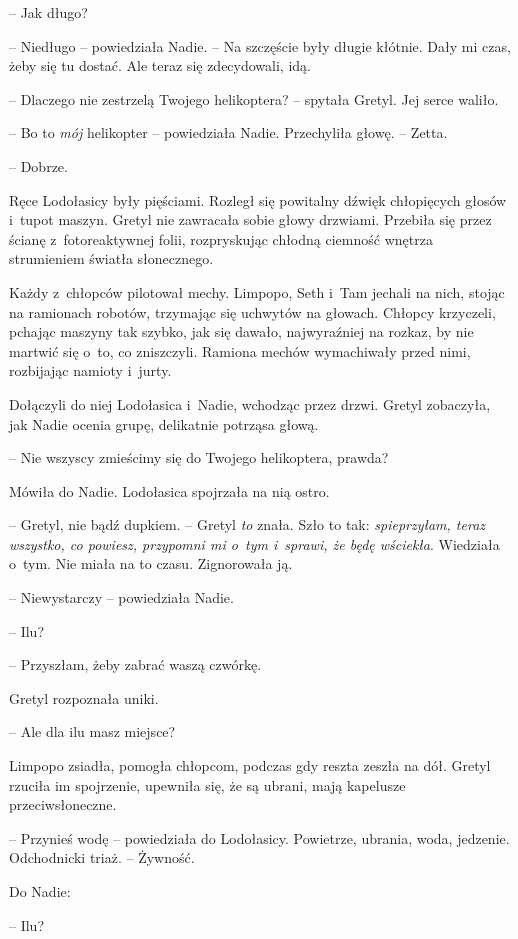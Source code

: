 \documentclass[oneside,polish,11pt,sfheadings]{mwbk}
\begin{document}
-- Jak długo?

-- Niedługo -- powiedziała Nadie. -- Na szczęście były długie kłótnie. Dały
mi czas, żeby się tu dostać. Ale teraz się zdecydowali, idą.

-- Dlaczego nie zestrzelą Twojego helikoptera? -- spytała Gretyl. Jej
serce waliło.

-- Bo to \textit{mój} helikopter -- powiedziała Nadie. Przechyliła głowę. -- Zetta.

-- Dobrze.

Ręce Lodołasicy były pięściami. Rozległ się powitalny dźwięk chłopięcych
głosów i~tupot maszyn. Gretyl nie zawracała sobie głowy drzwiami.
Przebiła się przez ścianę z~fotoreaktywnej folii, rozpryskując chłodną
ciemność wnętrza strumieniem światła słonecznego.

Każdy z~chłopców pilotował mechy. Limpopo, Seth i~Tam jechali na nich,
stojąc na ramionach robotów, trzymając się uchwytów na głowach. Chłopcy
krzyczeli, pchając maszyny tak szybko, jak się dawało, najwyraźniej na
rozkaz, by nie martwić się o~to, co zniszczyli. Ramiona mechów
wymachiwały przed nimi, rozbijając namioty i~jurty.

Dołączyli do niej Lodołasica i~Nadie, wchodząc przez drzwi. Gretyl
zobaczyła, jak Nadie ocenia grupę, delikatnie potrząsa głową.

-- Nie wszyscy zmieścimy się do Twojego helikoptera, prawda?

Mówiła do Nadie. Lodołasica spojrzała na nią ostro. 

-- Gretyl, nie bądź dupkiem. -- Gretyl \textit{to} znała. Szło to tak: \textit{spieprzyłam, teraz
wszystko, co powiesz, przypomni mi o~tym i~sprawi, że będę wściekła}.
Wiedziała o~tym. Nie miała na to czasu. Zignorowała ją.

-- Niewystarczy -- powiedziała Nadie.

-- Ilu?

-- Przyszłam, żeby zabrać waszą czwórkę.

Gretyl rozpoznała uniki. 

-- Ale dla ilu masz miejsce?

Limpopo zsiadła, pomogła chłopcom, podczas gdy reszta zeszła na dół.
Gretyl rzuciła im spojrzenie, upewniła się, że są ubrani, mają kapelusze
przeciwsłoneczne. 

-- Przynieś wodę -- powiedziała do Lodołasicy. Powietrze, ubrania, woda, jedzenie. Odchodnicki triaż. -- Żywność.

Do Nadie: 

-- Ilu?
\end{document}
